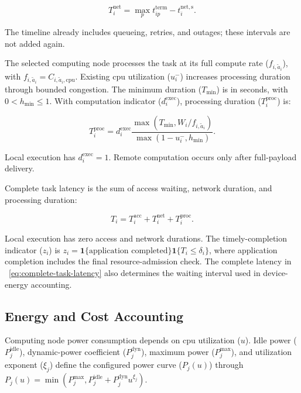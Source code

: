 \documentclass[journal]{IEEEtran}
\providecommand*{\algorithmautorefname}{Algorithm}
\providecommand*{\figureautorefname}{Figure}
\providecommand*{\subfigureautorefname}{Figure}
\providecommand*{\Autoref}[1]{%
  \begingroup
  \def\sectionautorefname{Section}%
  \def\subsectionautorefname{Subsection}%
  \def\subsubsectionautorefname{Subsubsection}%
  \def\algorithmautorefname{Algorithm}%
  \def\figureautorefname{Figure}%
  \def\subfigureautorefname{Figure}%
 ~\autoref{#1}%
  \endgroup
}
\newcommand{\Autoref}[1]{Eq.~\Autoref{#1}}
\begin{document}
\begin{equation}
\label{eq:network-duration}
T_i^{\mathrm{net}}
=
\max_p t_{ip}^{\mathrm{term}}
-t_i^{\mathrm{net,s}}.
\end{equation}

The timeline already includes queueing, retries, and outages; these intervals are not added again.

The selected computing node processes the task at its full compute rate (\(f_{i,\tilde a_i}\)), with \(f_{i,\tilde a_i}=C_{i,\tilde a_i,\mathrm{cpu}}\). Existing \acs{cpu} utilization (\(u_i^{-}\)) increases processing duration through bounded congestion. The minimum duration (\(T_{\min}\)) is in seconds, with \(0<h_{\min}\leq1\). With computation indicator (\(d_i^{\mathrm{exec}}\)), processing duration (\(T_i^{\mathrm{proc}}\)) is:

\begin{equation}
\label{eq:processing-duration}
T_i^{\mathrm{proc}}
=
d_i^{\mathrm{exec}}
\frac{
\max\!\left(T_{\min},W_i/f_{i,\tilde a_i}\right)
}{
\max(1-u_i^{-},h_{\min})
}.
\end{equation}

Local execution has \(d_i^{\mathrm{exec}}=1\). Remote computation occurs only after full-payload delivery.

Complete task latency is the sum of access waiting, network duration, and processing duration:

\begin{equation}
\label{eq:complete-task-latency}
T_i
=
T_i^{\mathrm{acc}}
+
T_i^{\mathrm{net}}
+
T_i^{\mathrm{proc}}.
\end{equation}

Local execution has zero access and network durations. The timely-completion indicator (\(z_i\)) is \(z_i=\mathbf1\{\text{application completed}\}\mathbf1\{T_i\leq\delta_i\}\), where application completion includes the final resource-admission check. The complete latency in~\Autoref{eq:complete-task-latency} also determines the waiting interval used in device-energy accounting.

\subsection{Energy and Cost Accounting}
\label{subsec:energy-cost-accounting}

Computing node power consumption depends on \acs{cpu} utilization (\(u\)). Idle power (\(P_j^{\mathrm{idle}}\)), dynamic-power coefficient (\(P_j^{\mathrm{dyn}}\)), maximum power (\(P_j^{\max}\)), and utilization exponent (\(\xi_j\)) define the configured power curve (\(P_j(u)\)) through \(P_j(u)=\min(P_j^{\max},P_j^{\mathrm{idle}}+P_j^{\mathrm{dyn}}u^{\xi_j})\).
\end{document}
